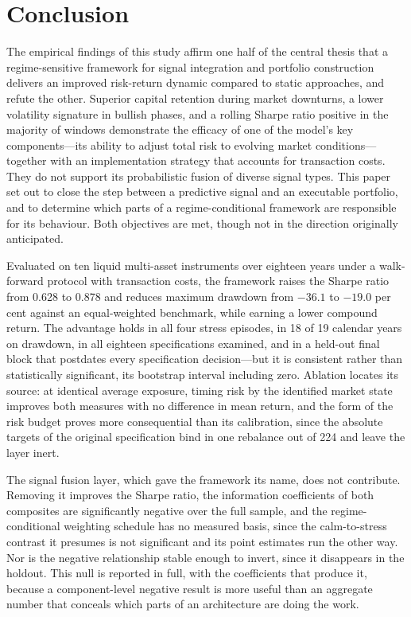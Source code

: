 \section{Conclusion}
\label{sec:conclusion}

The empirical findings of this study affirm one half of the central thesis that a
regime-sensitive framework for signal integration and portfolio construction delivers an
improved risk-return dynamic compared to static approaches, and refute the other. Superior
capital retention during market downturns, a lower volatility signature in bullish phases,
and a rolling Sharpe ratio positive in the majority of windows demonstrate the efficacy of
one of the model's key components---its ability to adjust total risk to evolving market
conditions---together with an implementation strategy that accounts for transaction costs.
They do not support its probabilistic fusion of diverse signal types. This paper set out
to close the step between a predictive signal and an executable portfolio, and to
determine which parts of a regime-conditional framework are responsible for its behaviour.
Both objectives are met, though not in the direction originally anticipated.

Evaluated on ten liquid multi-asset instruments over eighteen years under a walk-forward
protocol with transaction costs, the framework raises the Sharpe ratio from 0.628 to
0.878 and reduces maximum drawdown from $-36.1$ to $-19.0$ per cent against an
equal-weighted benchmark, while earning a lower compound return. The advantage holds in
all four stress episodes, in 18 of 19 calendar years on drawdown, in all eighteen
specifications examined, and in a held-out final block that postdates every specification
decision---but it is consistent rather than statistically significant, its bootstrap
interval including zero. Ablation locates its source: at identical average exposure,
timing risk by the identified market state improves both measures with no difference in
mean return, and the form of the risk budget proves more consequential than its
calibration, since the absolute targets of the original specification bind in one
rebalance out of 224 and leave the layer inert.

The signal fusion layer, which gave the framework its name, does not contribute. Removing
it improves the Sharpe ratio, the information coefficients of both composites are
significantly negative over the full sample, and the regime-conditional weighting schedule
has no measured basis, since the calm-to-stress contrast it presumes is not significant and
its point estimates run the other way. Nor is the negative relationship stable enough to
invert, since it disappears in the holdout. This null is reported in full, with the
coefficients that produce it, because a component-level negative result is more useful than
an aggregate number that conceals which parts of an architecture are doing the work.


